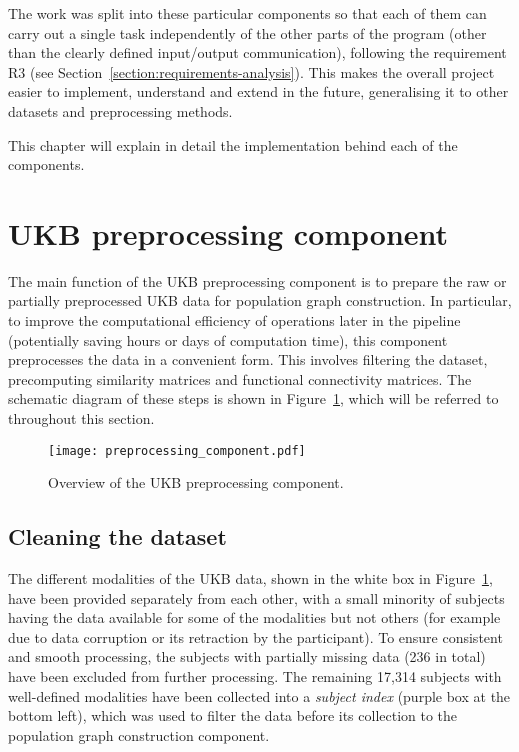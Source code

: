The work was split into these particular components so that each of them can carry out a single task independently of the other parts of the program (other than the clearly defined input/output communication), following the requirement R3 (see Section~\ref{section:requirements-analysis}). This makes the overall project easier to implement, understand and extend in the future, generalising it to other datasets and preprocessing methods. 

This chapter will explain in detail the implementation behind each of the components.

\section{UKB preprocessing component}
\label{section:ukb-preprocessing}

The main function of the UKB preprocessing component is to prepare the raw or partially preprocessed UKB data for population graph construction. In particular, to improve the computational efficiency of operations later in the pipeline (potentially saving hours or days of computation time), this component preprocesses the data in a convenient form. This involves filtering the dataset, precomputing similarity matrices and functional connectivity matrices. The schematic diagram of these steps is shown in Figure~\ref{preprocessing-component}, which will be referred to throughout this section.

\begin{figure}[h]
    \centering
    \texttt{[image: preprocessing\_component.pdf]}
    \caption{Overview of the UKB preprocessing component.}\label{preprocessing-component}
\end{figure}

\subsection{Cleaning the dataset}
The different modalities of the UKB data, shown in the white box in Figure~\ref{preprocessing-component}, have been provided separately from each other, with a small minority of subjects having the data available for some of the modalities but not others (for example due to data corruption or its retraction by the participant). To ensure consistent and smooth processing, the subjects with partially missing data (236 in total) have been excluded from further processing. The remaining 17,314 subjects with well-defined modalities have been collected into a \textit{subject index} (purple box at the bottom left), which was used to filter the data before its collection to the population graph construction component.

